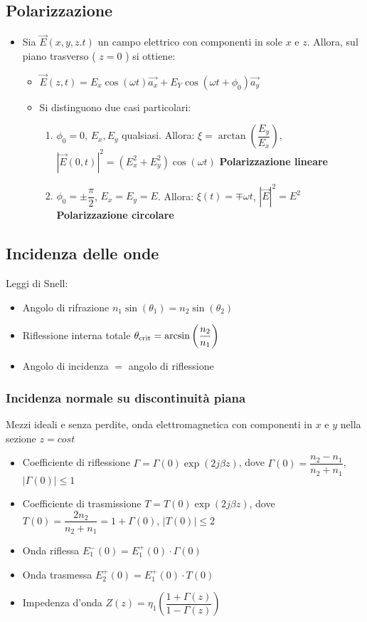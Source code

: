 \documentclass{article}
\begin{document}
\subsection{Polarizzazione}
\begin{itemize}
	\item Sia \( \vec{E}(x, y, z. t) \) un campo elettrico con componenti in sole \( x \) e \( z \). Allora, sul piano trasverso ( \( z = 0 \) ) si ottiene:
	\begin{itemize}
		\item \( \vec{E}(z, t) = E_x \cos ( \omega t) \vec{a_x} + E_Y \cos( \omega t + \phi_0) \vec{a_y}  \)
		\item Si distinguono due casi particolari:
		\begin{enumerate}
			\item \( \phi_0 = 0 \), \( E_x, E_y \) qualsiasi. Allora: \( \xi  = \arctan\left(\dfrac{E_y}{E_x}\right) \), \( |\vec{E}(0, t)|^2 = (E_x^2 + E_y^2) \cos(\omega t) \) \textbf{Polarizzazione lineare}
			\item  \( \phi_0 = \pm \dfrac{\pi}{2} \), \( E_x = E_y = E \). Allora: \( \xi(t)  = \mp \omega t \), \( |\vec{E}|^2 = E^2 \) \textbf{Polarizzazione circolare}
		\end{enumerate}
	\end{itemize}	  
\end{itemize}

\subsection{Incidenza delle onde}
Leggi di Snell:
\begin{itemize}
	\item Angolo di rifrazione \(n_1 \sin(\theta_1) = n_2 \sin(\theta_2) \)
	\item Riflessione interna totale \(\theta_{\textnormal{crit}} = \arcsin\left( \dfrac{n_2}{n_1} \right) \)
	\item Angolo di incidenza \(=\) angolo di riflessione
\end{itemize}
\subsubsection{Incidenza normale su discontinuità piana}
Mezzi ideali e senza perdite, onda elettromagnetica con componenti in \( x \) e \( y \) nella sezione \( z = cost \)
\begin{itemize}
	\item Coefficiente di riflessione \( \Gamma = \Gamma(0) \exp(2 j \beta z)  \), dove \( \Gamma(0) = \dfrac{n_2 - n_1}{n_2 + n_1}\), \( | \Gamma(0) | \leq 1 \)
	\item Coefficiente di trasmissione \( T = T(0) \exp(2 j \beta z)  \), dove \( T(0) = \dfrac{2 n_2}{n_2 + n_1} = 1 + \Gamma(0)\), \( | T(0) | \leq 2 \)
	\item Onda riflessa \( E_1^-(0) =  E_1^+(0) \cdot \Gamma (0) \)
	\item Onda trasmessa \( E_2^+(0) =  E_1^+(0) \cdot T (0) \)
	\item Impedenza d'onda \( Z(z) = \eta_1 \left(\dfrac{1 + \Gamma(z)}{1 - \Gamma(z)}\right) \)
\end{itemize}
\end{document}
